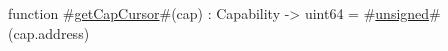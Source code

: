 function #\hyperref[sailMIPSzgetCapCursor]{getCapCursor}#(cap) : Capability -> uint64 = #\hyperref[sailMIPSzunsigned]{unsigned}#(cap.address)

